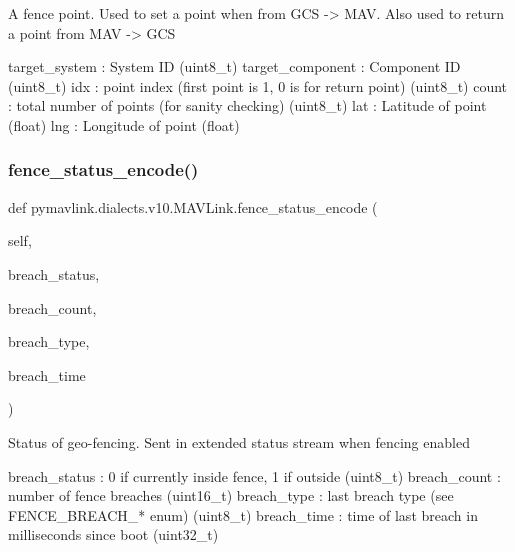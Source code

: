 \begin{DoxyVerb}
\begin{DoxyVerb}
\begin{DoxyVerb}A fence point. Used to set a point when from GCS -> MAV. Also used to
return a point from MAV -> GCS

target_system             : System ID (uint8_t)
target_component          : Component ID (uint8_t)
idx                       : point index (first point is 1, 0 is for return point) (uint8_t)
count                     : total number of points (for sanity checking) (uint8_t)
lat                       : Latitude of point (float)
lng                       : Longitude of point (float)\end{DoxyVerb}
 \mbox{\label{classpymavlink_1_1dialects_1_1v10_1_1MAVLink_a71abbc2d37a0cdc0bfe075a1b84d9b14}} 
\subsubsection{\texorpdfstring{fence\+\_\+status\+\_\+encode()}{fence\_status\_encode()}}
{\footnotesize\ttfamily def pymavlink.\+dialects.\+v10.\+M\+A\+V\+Link.\+fence\+\_\+status\+\_\+encode (\begin{DoxyParamCaption}\item[{}]{self,  }\item[{}]{breach\+\_\+status,  }\item[{}]{breach\+\_\+count,  }\item[{}]{breach\+\_\+type,  }\item[{}]{breach\+\_\+time }\end{DoxyParamCaption})}

\begin{DoxyVerb}Status of geo-fencing. Sent in extended status stream when fencing
enabled

breach_status             : 0 if currently inside fence, 1 if outside (uint8_t)
breach_count              : number of fence breaches (uint16_t)
breach_type               : last breach type (see FENCE_BREACH_* enum) (uint8_t)
breach_time               : time of last breach in milliseconds since boot (uint32_t)\end{DoxyVerb}
 \mbox{\label{classpymavlink_1_1dialects_1_1v10_1_1MAVLink_a8beb62e953ac18f013eeb8d788ebf6fd}} 

\end{DoxyVerb}
\end{DoxyVerb}
